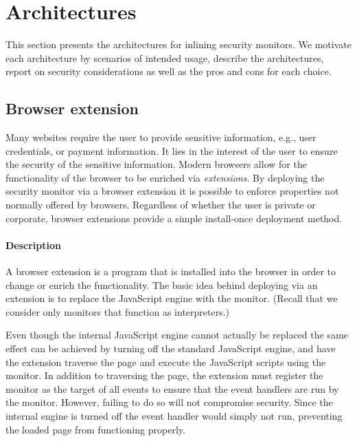 \documentclass{llncs}
\begin{document}


\section{Architectures}
\label{sec:arch}
\vspace{-.04cm}
This section presents the architectures for inlining
security monitors. We motivate each architecture by scenarios of
intended usage, describe the architectures, report on
security considerations as well as the pros and cons for each choice.




\subsection{Browser extension}\label{sec:arch:ext}

Many websites require the user to provide sensitive information, e.g., user
credentials, or payment information. It lies in the interest of the user to
ensure the security of the sensitive information.  Modern browsers allow for
the functionality of the browser to be enriched via \emph{extensions}. By
deploying the security monitor via a browser extension it is possible to enforce
properties not normally offered by browsers.  Regardless of whether the user is
private or corporate, browser extensions provide a simple 
install-once deployment method.


\paragraph{Description}

A browser extension is a program that is installed into the browser in order to
change or enrich the functionality.  The basic idea behind
deploying via an extension is to replace the JavaScript engine with the monitor.
(Recall that we consider only monitors that function as interpreters.)

Even though the internal JavaScript engine cannot actually be replaced the same
effect can be achieved by turning off the standard JavaScript engine, and have
the extension traverse the page and execute the JavaScript scripts
using the monitor. 
In addition to traversing the page, the extension must register the monitor as the target of
all events to ensure that the event handlers are run by the monitor. However, failing to
do so will not compromise security. Since the internal engine is turned off
the event handler would simply not run, preventing the loaded page from functioning
properly.
\end{document}

